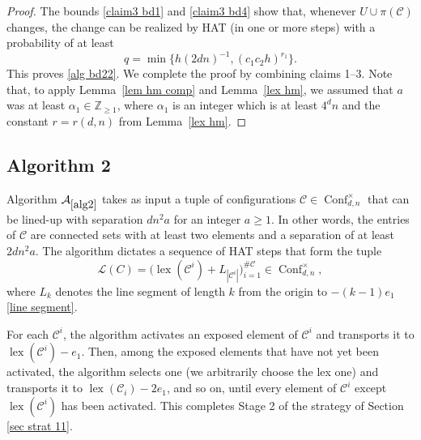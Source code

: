 \documentclass[11pt,reqno]{amsart}
\theoremstyle{definition}
\numberwithin{equation}{section}
\newcommand{\Z}{\mathbb{Z}}
\newcommand{\1}{\mathbf{1}}
\DeclareMathOperator{\lex}{lex}
\newcommand{\CC}{\mathcal{C}}
\DeclareMathOperator{\Conf}{\mathrm{Conf}}
\begin{document}
\begin{proof}
The bounds \eqref{claim3 bd1} and \eqref{claim3 bd4} show that, whenever $U \cup \pi (\CC)$ changes, the change can be realized by HAT (in one or more steps) with a probability of at least
\[ q = \min \big\{ h (2dn)^{-1}, (c_1c_2h)^{r_1} \big\}. \]
This proves \eqref{alg bd22}. We complete the proof by combining claims 1--3. Note that, to apply Lemma~\ref{lem hm comp} and Lemma~\ref{lex hm}, we assumed that $a$ was at least $\alpha_1 \in \Z_{\geq 1}$, where $\alpha_1$ is an integer which is at least $4^d n$ and the constant $r = r(d,n)$ from Lemma~\ref{lex hm}.
\end{proof}


\subsection{Algorithm 2}\label{sec rearrange}

Algorithm $\mathcal{A}_{\ref{alg2}}$ takes as input a tuple of configurations $\CC \in \Conf_{d,n}^\times$ that can be lined-up with separation $dn^2 a$ for an integer $a \geq 1$. In other words, the entries of $\CC$ are connected sets with at least two elements and a separation of at least $2dn^2 a$. The algorithm dictates a sequence of HAT steps that form the tuple
\begin{equation}\label{lined up tuple}
\mathcal{L} (C) = \big( \lex (\CC^i) + L_{|\CC^i|} \big)_{i=1}^{\# \CC} \in \Conf_{d,n}^\times,
\end{equation}
where $L_k$ denotes the line segment of length $k$ from the origin to $-(k-1)e_1$ \eqref{line segment}. 

For each $\CC^i$, the algorithm activates an exposed element of $\CC^i$ and transports it to $\lex (\CC^i) - e_1$. Then, among the exposed elements that have not yet been activated, the algorithm selects one (we arbitrarily choose the lex one) and transports it to $\lex (\CC_i) - 2e_1$, and so on, until every element of $\CC^i$ except $\lex (\CC^i)$ has been activated. This completes Stage 2 of the strategy of Section \ref{sec strat 11}.\\ 
\end{document}
